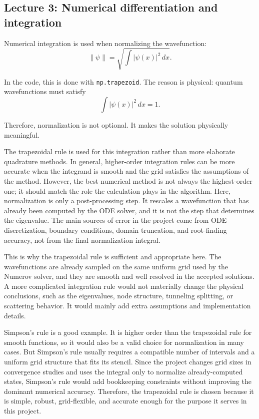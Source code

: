 \documentclass[11pt]{article}
\begin{document}
    \subsection{Lecture 3: Numerical differentiation and integration}

    Numerical integration is used when normalizing the wavefunction:
    \begin{equation}
        \|\psi\| = \sqrt{\int |\psi(x)|^2\,dx}.
    \end{equation}

    In the code, this is done with \texttt{np.trapezoid}. The reason is physical: quantum wavefunctions must satisfy
    \begin{equation}
        \int |\psi(x)|^2\,dx = 1.
    \end{equation}

    Therefore, normalization is not optional. It makes the solution physically meaningful.

    The trapezoidal rule is used for this integration rather than more elaborate quadrature methods. In general, higher-order integration rules can be more accurate when the integrand is smooth and the grid satisfies the assumptions of the method. However, the best numerical method is not always the highest-order one; it should match the role the calculation plays in the algorithm. Here, normalization is only a post-processing step. It rescales a wavefunction that has already been computed by the ODE solver, and it is not the step that determines the eigenvalue. The main sources of error in the project come from ODE discretization, boundary conditions, domain truncation, and root-finding accuracy, not from the final normalization integral.

    This is why the trapezoidal rule is sufficient and appropriate here. The wavefunctions are already sampled on the same uniform grid used by the Numerov solver, and they are smooth and well resolved in the accepted solutions. A more complicated integration rule would not materially change the physical conclusions, such as the eigenvalues, node structure, tunneling splitting, or scattering behavior. It would mainly add extra assumptions and implementation details.

    Simpson's rule is a good example. It is higher order than the trapezoidal rule for smooth functions, so it would also be a valid choice for normalization in many cases. But Simpson's rule usually requires a compatible number of intervals and a uniform grid structure that fits its stencil. Since the project changes grid sizes in convergence studies and uses the integral only to normalize already-computed states, Simpson's rule would add bookkeeping constraints without improving the dominant numerical accuracy. Therefore, the trapezoidal rule is chosen because it is simple, robust, grid-flexible, and accurate enough for the purpose it serves in this project.
\end{document}
